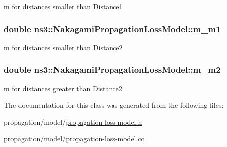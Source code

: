 m for distances smaller than Distance1 

\subsubsection[{\texorpdfstring{m\+\_\+m1}{m_m1}}]{\setlength{\rightskip}{0pt plus 5cm}double ns3\+::\+Nakagami\+Propagation\+Loss\+Model\+::m\+\_\+m1\hspace{0.3cm}{\ttfamily [private]}}\hypertarget{classns3_1_1NakagamiPropagationLossModel_aa233b3621162f0f006ca8d00ffb14bd6}{}\label{classns3_1_1NakagamiPropagationLossModel_aa233b3621162f0f006ca8d00ffb14bd6}


m for distances smaller than Distance2 

\subsubsection[{\texorpdfstring{m\+\_\+m2}{m_m2}}]{\setlength{\rightskip}{0pt plus 5cm}double ns3\+::\+Nakagami\+Propagation\+Loss\+Model\+::m\+\_\+m2\hspace{0.3cm}{\ttfamily [private]}}\hypertarget{classns3_1_1NakagamiPropagationLossModel_ac4d82f72fb23d6cc852de0348c686fc2}{}\label{classns3_1_1NakagamiPropagationLossModel_ac4d82f72fb23d6cc852de0348c686fc2}


m for distances greater than Distance2 



The documentation for this class was generated from the following files\+:\begin{DoxyCompactItemize}
\item 
propagation/model/\hyperlink{propagation-loss-model_8h}{propagation-\/loss-\/model.\+h}\item 
propagation/model/\hyperlink{propagation-loss-model_8cc}{propagation-\/loss-\/model.\+cc}\end{DoxyCompactItemize}
